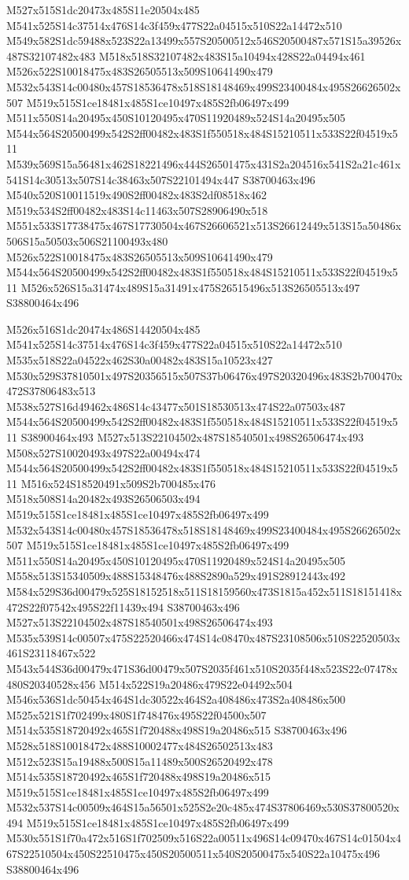 \documentclass{article}
\begin{document}
\begin{multicols}{2}
M527x515S1dc20473x485S11e20504x485 M541x525S14c37514x476S14c3f459x477S22a04515x510S22a14472x510 M549x582S1dc59488x523S22a13499x557S20500512x546S20500487x571S15a39526x487S32107482x483 M518x518S32107482x483S15a10494x428S22a04494x461 M526x522S10018475x483S26505513x509S10641490x479 M532x543S14c00480x457S18536478x518S18148469x499S23400484x495S26626502x507 M519x515S1ce18481x485S1ce10497x485S2fb06497x499 M511x550S14a20495x450S10120495x470S11920489x524S14a20495x505 M544x564S20500499x542S2ff00482x483S1f550518x484S15210511x533S22f04519x511 M539x569S15a56481x462S18221496x444S26501475x431S2a204516x541S2a21c461x541S14c30513x507S14c38463x507S22101494x447 S38700463x496 M540x520S10011519x490S2ff00482x483S2df08518x462 M519x534S2ff00482x483S14c11463x507S28906490x518 M551x533S17738475x467S17730504x467S26606521x513S26612449x513S15a50486x506S15a50503x506S21100493x480 M526x522S10018475x483S26505513x509S10641490x479 M544x564S20500499x542S2ff00482x483S1f550518x484S15210511x533S22f04519x511 M526x526S15a31474x489S15a31491x475S26515496x513S26505513x497 S38800464x496

M526x516S1dc20474x486S14420504x485 M541x525S14c37514x476S14c3f459x477S22a04515x510S22a14472x510 M535x518S22a04522x462S30a00482x483S15a10523x427 M530x529S37810501x497S20356515x507S37b06476x497S20320496x483S2b700470x472S37806483x513 M538x527S16d49462x486S14c43477x501S18530513x474S22a07503x487 M544x564S20500499x542S2ff00482x483S1f550518x484S15210511x533S22f04519x511 S38900464x493 M527x513S22104502x487S18540501x498S26506474x493 M508x527S10020493x497S22a00494x474 M544x564S20500499x542S2ff00482x483S1f550518x484S15210511x533S22f04519x511 M516x524S18520491x509S2b700485x476 M518x508S14a20482x493S26506503x494 M519x515S1ce18481x485S1ce10497x485S2fb06497x499 M532x543S14c00480x457S18536478x518S18148469x499S23400484x495S26626502x507 M519x515S1ce18481x485S1ce10497x485S2fb06497x499 M511x550S14a20495x450S10120495x470S11920489x524S14a20495x505 M558x513S15340509x488S15348476x488S2890a529x491S28912443x492 M584x529S36d00479x525S18152518x511S18159560x473S1815a452x511S18151418x472S22f07542x495S22f11439x494 S38700463x496 M527x513S22104502x487S18540501x498S26506474x493 M535x539S14c00507x475S22520466x474S14c08470x487S23108506x510S22520503x461S23118467x522 M543x544S36d00479x471S36d00479x507S2035f461x510S2035f448x523S22c07478x480S20340528x456 M514x522S19a20486x479S22e04492x504 M546x536S1dc50454x464S1dc30522x464S2a408486x473S2a408486x500 M525x521S1f702499x480S1f748476x495S22f04500x507 M514x535S18720492x465S1f720488x498S19a20486x515 S38700463x496 M528x518S10018472x488S10002477x484S26502513x483 M512x523S15a19488x500S15a11489x500S26520492x478 M514x535S18720492x465S1f720488x498S19a20486x515 M519x515S1ce18481x485S1ce10497x485S2fb06497x499 M532x537S14c00509x464S15a56501x525S2e20c485x474S37806469x530S37800520x494 M519x515S1ce18481x485S1ce10497x485S2fb06497x499 M530x551S1f70a472x516S1f702509x516S22a00511x496S14c09470x467S14c01504x467S22510504x450S22510475x450S20500511x540S20500475x540S22a10475x496 S38800464x496


\end{multicols}
\end{document}
